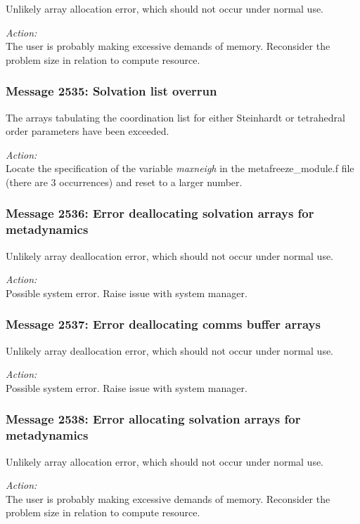 Unlikely array allocation error, which should not occur under normal use.

\noindent
{\em Action:}\\ The user is probably making excessive demands of
memory. Reconsider the problem size in relation to compute resource.
          
\subsubsection*{Message 2535: Solvation list overrun}

The arrays tabulating the coordination list for either Steinhardt or
tetrahedral order parameters have been exceeded.

\noindent
{\em Action:}\\ Locate the specification of the variable {\em maxneigh} in the
metafreeze\_module.f file (there are 3 occurrences) and reset to a larger
number.

\subsubsection*{Message 2536: Error deallocating solvation arrays for 
metadynamics}

Unlikely array deallocation error, which should not occur under normal use.

\noindent
{\em Action:}\\ Possible system error. Raise issue with system manager.
          
\subsubsection*{Message 2537: Error deallocating comms buffer arrays}

Unlikely array deallocation error, which should not occur under normal use.

\noindent
{\em Action:}\\ Possible system error. Raise issue with system manager.
          
\subsubsection*{Message 2538: Error allocating solvation arrays for 
metadynamics}

Unlikely array allocation error, which should not occur under normal use.

\noindent
{\em Action:}\\ The user is probably making excessive demands of
memory. Reconsider the problem size in relation to compute resource.
          
